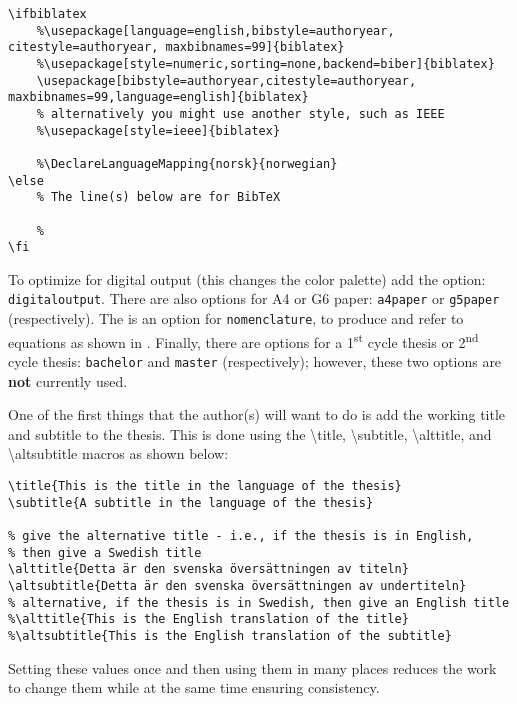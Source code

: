 \documentclass[examplethesis.tex]{subfiles}
\begin{document}
\begin{lstlisting}[style=latexExampleForAuthors]
\ifbiblatex
    %\usepackage[language=english,bibstyle=authoryear, citestyle=authoryear, maxbibnames=99]{biblatex}
    %\usepackage[style=numeric,sorting=none,backend=biber]{biblatex}
    \usepackage[bibstyle=authoryear,citestyle=authoryear, maxbibnames=99,language=english]{biblatex}
    % alternatively you might use another style, such as IEEE
    %\usepackage[style=ieee]{biblatex}
    
    %\DeclareLanguageMapping{norsk}{norwegian}
\else
    % The line(s) below are for BibTeX
    
    %
\fi
\end{lstlisting}

To optimize for digital output (this changes the color palette) add the option: \texttt{digitaloutput}. There are also options for A4 or G6 paper: \texttt{a4paper} or \texttt{g5paper} (respectively). The is an option for \texttt{nomenclature}, to produce and refer to equations
\ifnomenclature
as shown in 
\fi
.  Finally, there are options for a 1\textsuperscript{st} cycle thesis or 2\textsuperscript{nd} cycle thesis: \texttt{bachelor} and \texttt{master} (respectively); however, these two options are \textbf{not} currently used.

One of the first things that the author(s) will want to do is add the working title and subtitle to the thesis. This is done using the \textbackslash title, \textbackslash subtitle, \textbackslash alttitle, and \textbackslash altsubtitle macros as shown below:
\begin{lstlisting}[style=latexExampleForAuthors]
\title{This is the title in the language of the thesis}
\subtitle{A subtitle in the language of the thesis}

% give the alternative title - i.e., if the thesis is in English,
% then give a Swedish title
\alttitle{Detta är den svenska översättningen av titeln}
\altsubtitle{Detta är den svenska översättningen av undertiteln}
% alternative, if the thesis is in Swedish, then give an English title
%\alttitle{This is the English translation of the title}
%\altsubtitle{This is the English translation of the subtitle}   
\end{lstlisting}

Setting these values once and then using them in many places reduces the work to change them while at the same time ensuring consistency. 
\end{document}
